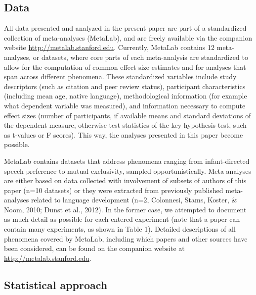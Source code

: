 \documentclass[english,floatsintext,man]{apa6}
\newcounter{author}
\begin{document}
\subsection{Data}\label{data}

All data presented and analyzed in the present paper are part of a
standardized collection of meta-analyses (MetaLab), and are freely
available via the companion website \url{http://metalab.stanford.edu}.
Currently, MetaLab contains 12 meta-analyses, or datasets, where core
parts of each meta-analysis are standardized to allow for the
computation of common effect size estimates and for analyses that span
across different phenomena. These standardized variables include study
descriptors (such as citation and peer review status), participant
characteristics (including mean age, native language), methodological
information (for example what dependent variable was measured), and
information necessary to compute effect sizes (number of participants,
if available means and standard deviations of the dependent measure,
otherwise test statistics of the key hypothesis test, such as t-values
or F scores). This way, the analyses presented in this paper become
possible.

MetaLab contains datasets that address phenomena ranging from
infant-directed speech preference to mutual exclusivity, sampled
opportunistically. Meta-analyses are either based on data collected with
involvement of subsets of authors of this paper (n=10 datasets) or they
were extracted from previously published meta-analyses related to
language development (n=2, Colonnesi, Stams, Koster, \& Noom, 2010;
Dunst et al., 2012). In the former case, we attempted to document as
much detail as possible for each entered experiment (note that a paper
can contain many experiments, as shown in Table 1). Detailed
descriptions of all phenomena covered by MetaLab, including which papers
and other sources have been considered, can be found on the companion
website at \url{http://metalab.stanford.edu}.

\subsection{Statistical approach}\label{statistical-approach}
\end{document}

